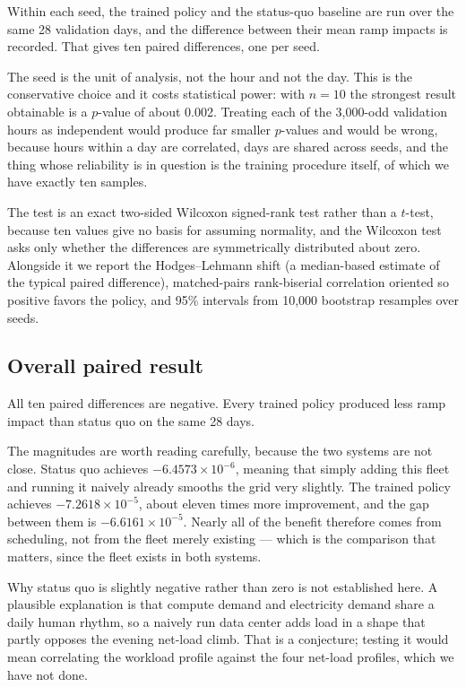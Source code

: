 ﻿\documentclass[12pt]{article}
\begin{document}
Within each seed, the trained policy and the status-quo baseline are run over
the same 28 validation days, and the difference between their mean ramp impacts
is recorded. That gives ten paired differences, one per seed.

The seed is the unit of analysis, not the hour and not the day. This is the
conservative choice and it costs statistical power: with \(n=10\) the strongest
result obtainable is a \(p\)-value of about 0.002. Treating each of the 3,000-odd
validation hours as independent would produce far smaller \(p\)-values and would
be wrong, because hours within a day are correlated, days are shared across
seeds, and the thing whose reliability is in question is the training procedure
itself, of which we have exactly ten samples.

The test is an exact two-sided Wilcoxon signed-rank test rather than a
\(t\)-test, because ten values give no basis for assuming normality, and the
Wilcoxon test asks only whether the differences are symmetrically distributed
about zero. Alongside it we report the Hodges--Lehmann shift (a median-based
estimate of the typical paired difference), matched-pairs rank-biserial
correlation oriented so positive favors the policy, and 95\% intervals from
10,000 bootstrap resamples over seeds.

\subsection{Overall paired result}
\label{subsec:campaign-overall}

All ten paired differences are negative. Every trained policy produced less ramp
impact than status quo on the same 28 days.

The magnitudes are worth reading carefully, because the two systems are not
close. Status quo achieves \(-6.4573\times10^{-6}\), meaning that simply adding
this fleet and running it naively already smooths the grid very slightly. The
trained policy achieves \(-7.2618\times10^{-5}\), about eleven times more
improvement, and the gap between them is \(-6.6161\times10^{-5}\). Nearly all
of the benefit therefore comes from scheduling, not from the fleet merely
existing --- which is the comparison that matters, since the fleet exists in
both systems.

Why status quo is slightly negative rather than zero is not established here. A
plausible explanation is that compute demand and electricity demand share a
daily human rhythm, so a naively run data center adds load in a shape that
partly opposes the evening net-load climb. That is a conjecture; testing it
would mean correlating the workload profile against the four net-load profiles,
which we have not done.
\end{document}

